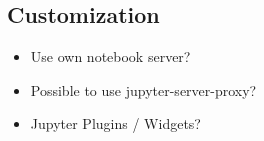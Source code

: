 
\subsection{Customization}
\label{s-customization}

\begin{itemize}
	\item Use own notebook server?
  \item Possible to use jupyter-server-proxy?
  \item Jupyter Plugins / Widgets?
\end{itemize}
